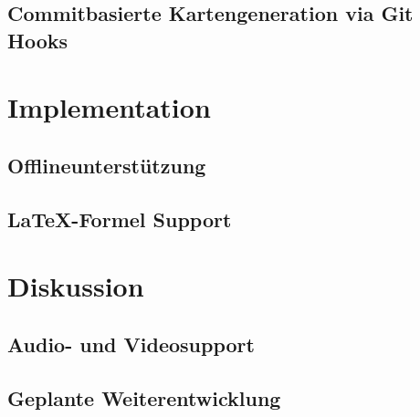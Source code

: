 \documentclass{article}
\begin{document}
\subsection{Commitbasierte Kartengeneration via Git Hooks}
\section{Implementation}
\subsection{Offlineunterst\"utzung}
\subsection{\LaTeX-Formel Support}
\section{Diskussion}
\subsection{Audio- und Videosupport}
\subsection{Geplante Weiterentwicklung}
\end{document}
